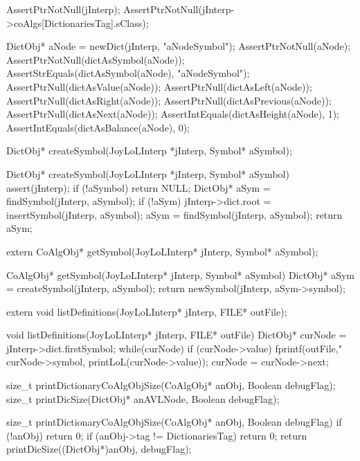 
\startCTest
  AssertPtrNotNull(jInterp);
  AssertPtrNotNull(jInterp->coAlgs[DictionariesTag].sClass);

  DictObj* aNode = newDict(jInterp, "aNodeSymbol");
  AssertPtrNotNull(aNode);
  AssertPtrNotNull(dictAsSymbol(aNode));
  AssertStrEquals(dictAsSymbol(aNode), "aNodeSymbol");
  AssertPtrNull(dictAsValue(aNode));
  AssertPtrNull(dictAsLeft(aNode));
  AssertPtrNull(dictAsRight(aNode));
  AssertPtrNull(dictAsPrevious(aNode));
  AssertPtrNull(dictAsNext(aNode));
  AssertIntEquals(dictAsHeight(aNode), 1);
  AssertIntEquals(dictAsBalance(aNode), 0);
\stopCTest
\stopTestCase
\stopTestSuite

\startTestSuite[createSymbol]

\startCHeader
DictObj* createSymbol(JoyLoLInterp *jInterp, Symbol* aSymbol);
\stopCHeader

\startCCode
DictObj* createSymbol(JoyLoLInterp *jInterp, Symbol* aSymbol) {
  assert(jInterp);
  if (!aSymbol) return NULL;
  DictObj* aSym = findSymbol(jInterp, aSymbol);
  if (!aSym) {
    jInterp->dict.root = insertSymbol(jInterp, aSymbol);
    aSym = findSymbol(jInterp, aSymbol);
  }
  return aSym;
}
\stopCCode
\stopTestSuite

\startCHeader
extern CoAlgObj* getSymbol(JoyLoLInterp* jInterp,
                           Symbol* aSymbol);
\stopCHeader

\startCCode
CoAlgObj* getSymbol(JoyLoLInterp* jInterp,
                    Symbol* aSymbol) {
  DictObj* aSym = createSymbol(jInterp, aSymbol);
  return newSymbol(jInterp, aSym->symbol);
}
\stopCCode

\startCHeader
extern void listDefinitions(JoyLoLInterp* jInterp, FILE* outFile);
\stopCHeader

\startCCode
void listDefinitions(JoyLoLInterp* jInterp, FILE* outFile) {
  DictObj* curNode = jInterp->dict.firstSymbol;
  while(curNode) {
    if (curNode->value) {
      fprintf(outFile,"%
              curNode->symbol, printLoL(curNode->value));
    }
    curNode = curNode->next;
  }
}
\stopCCode

\startCHeader
size_t printDictionaryCoAlgObjSize(CoAlgObj* anObj, Boolean debugFlag);
size_t printDicSize(DictObj* anAVLNode, Boolean debugFlag);
\stopCHeader

\startCCode
size_t printDictionaryCoAlgObjSize(CoAlgObj* anObj, Boolean debugFlag) {
  if (!anObj) return 0;
  if (anObj->tag != DictionariesTag) return 0;
  return printDicSize((DictObj*)anObj, debugFlag);
}

